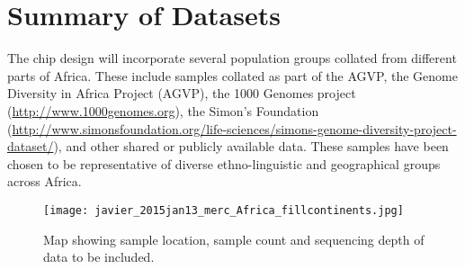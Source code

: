 \section{Summary of Datasets}
The chip design will incorporate several population groups collated from different parts of Africa. These include samples collated as part of the AGVP, the Genome Diversity in Africa Project (AGVP), the 1000 Genomes project (\href{http://www.1000genomes.org}{http://www.1000genomes.org}), the Simon’s Foundation (\href{http://www.simonsfoundation.org/life-sciences/simons-genome-diversity-project-dataset/}{http://www.simonsfoundation.org/life-sciences/simons-genome-diversity-project-dataset/}), and other shared or publicly available data. These samples have been chosen to be representative of diverse ethno-linguistic and geographical groups across Africa.


\begin{figure}[h]
\caption{Map showing sample location, sample count and sequencing depth of data to be included.}
\centering
\texttt{[image: javier\_2015jan13\_merc\_Africa\_fillcontinents.jpg]}
\end{figure}